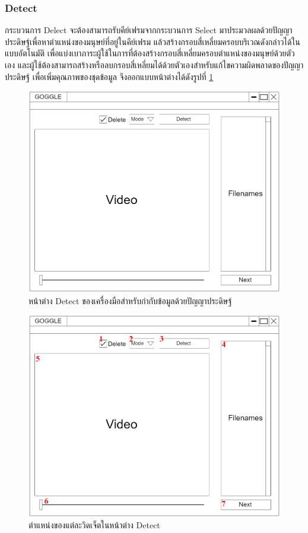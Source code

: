 \subsubsection{Detect}
กระบวนการ Delect จะต้องสามารถรับคีย์เฟรมจากกระบวนการ Select มาประมวลผลด้วยปัญญาประดิษฐ์เพื่อหาตำแหน่งของมนุษย์ที่อยู่ในคีย์เฟรม 
แล้วสร้างกรอบสี่เหลี่ยมครอบบริเวณดังกล่าวได้ในแบบอัตโนมัติ เพื่อแบ่งเบาภาระผู้ใช้ในการที่ต้องสร้างกรอบสี่เหลี่ยมครอบตำแหน่งของมนุษย์ด้วยตัวเอง
และผู้ใช้ต้องสามารถสร้างหรือลบกรอบสี่เหลี่ยมได้ด้วยตัวเองสำหรับแก้ไขความผิดพลาดของปัญญาประดิษฐ์ เพื่อเพิ่มคุณภาพของชุดข้อมูล
จึงออกแบบหน้าต่างได้ดังรูปที่ \ref{fig:DetectDraft}
\begin{figure}[!ht]
    \centering
    \includegraphics[width=1\textwidth]{chapter3/images/3_6/DetectDraft.png}
    \caption{หน้าต่าง Detect ของเครื่องมือสำหรับกำกับข้อมูลด้วยปัญญาประดิษฐ์}
    \label{fig:DetectDraft}
\end{figure}
\clearpage
\begin{figure}[!ht]
    \centering
    \includegraphics[width=1\textwidth]{chapter3/images/3_6/DetectDraft_point.png}
    \caption{ตำแหน่งของแต่ละวิดเจ็ตในหน้าต่าง Detect}
    \label{fig:DelectDraft_point}
\end{figure}
